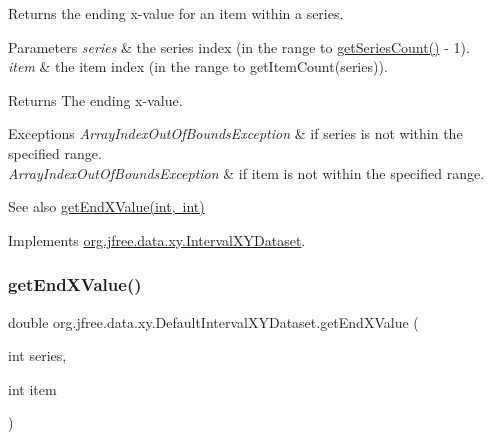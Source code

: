 Returns the ending x-\/value for an item within a series.


\begin{DoxyParams}{Parameters}
{\em series} & the series index (in the range {} to {\ttfamily \mbox{\hyperlink{classorg_1_1jfree_1_1data_1_1xy_1_1_default_interval_x_y_dataset_a11470bfa9b540c971123d4282c0f5a8a}{get\+Series\+Count()}} -\/ 1}). \\
\hline
{\em item} & the item index (in the range {} to {\ttfamily get\+Item\+Count(series)}).\\
\hline
\end{DoxyParams}
\begin{DoxyReturn}{Returns}
The ending x-\/value.
\end{DoxyReturn}

\begin{DoxyExceptions}{Exceptions}
{\em Array\+Index\+Out\+Of\+Bounds\+Exception} & if {\ttfamily series} is not within the specified range. \\
\hline
{\em Array\+Index\+Out\+Of\+Bounds\+Exception} & if {\ttfamily item} is not within the specified range.\\
\hline
\end{DoxyExceptions}
\begin{DoxySeeAlso}{See also}
\mbox{\hyperlink{classorg_1_1jfree_1_1data_1_1xy_1_1_default_interval_x_y_dataset_aa54ecfa001d13ac8b1bab7e0a66d13a8}{get\+End\+X\+Value(int, int)}} 
\end{DoxySeeAlso}


Implements \mbox{\hyperlink{interfaceorg_1_1jfree_1_1data_1_1xy_1_1_interval_x_y_dataset_a93161a6d6c1db37cfac030239c62ab0a}{org.\+jfree.\+data.\+xy.\+Interval\+X\+Y\+Dataset}}.

\mbox{\label{classorg_1_1jfree_1_1data_1_1xy_1_1_default_interval_x_y_dataset_aa54ecfa001d13ac8b1bab7e0a66d13a8}} 
\subsubsection{\texorpdfstring{get\+End\+X\+Value()}{getEndXValue()}}
{\footnotesize\ttfamily double org.\+jfree.\+data.\+xy.\+Default\+Interval\+X\+Y\+Dataset.\+get\+End\+X\+Value (\begin{DoxyParamCaption}\item[{int}]{series,  }\item[{int}]{item }\end{DoxyParamCaption})}

